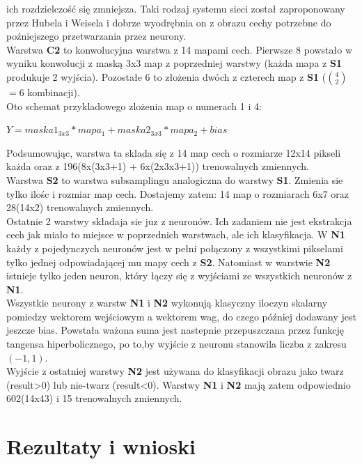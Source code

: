 \documentclass[11pt,a4paper]{article}
\begin{document}
ich rozdzielczość się zmniejsza. Taki rodzaj systemu sieci został zaproponowany przez Hubela i Weisela i dobrze 
wyodrębnia on z obrazu cechy potrzebne do poźniejszego przetwarzania przez neurony.\\
\indent
Warstwa  \textbf{C2} to konwolucyjna warstwa z 14 mapami cech. Pierwsze 8 powstało w wyniku konwolucji 
z maską 3x3 map z poprzedniej warstwy (każda mapa z  \textbf{S1} produkuje 2 wyjścia).
Pozostałe 6 to złożenia dwóch z czterech map z  \textbf{S1} ($4\choose 2$ $=6$ kombinacji).\\
Oto schemat przykladowego zlożenia map o numerach 1 i 4:\\
\begin{center}
$Y = maska1_{3x3}*mapa_{1}+maska2_{3x3}*mapa_{2}+bias$
\end{center}
Podsumowując, warstwa ta sklada się z 14 map cech o rozmiarze 12x14 pikseli każda oraz z 196(8x(3x3+1)
+ 6x(2x3x3+1)) trenowalnych zmiennych.\\
\indent
Warstwa  \textbf{S2} to warstwa subsamplingu analogiczna do warstwy  \textbf{S1}. 
Zmienia sie tylko ilośc i rozmiar map cech. 
Dostajemy zatem: 14 map o rozmiarach 6x7 oraz 28(14x2) trenowalnych zmiennych.\\
\indent
Ostatnie 2 warstwy składaja sie juz z neuronów. Ich zadaniem nie jest ekstrakcja cech jak miało to miejsce 
w poprzednich warstwach, ale ich klasyfikacja. W  \textbf{N1} każdy z pojedynczych neuronów jest w pełni
połączony z wszystkimi pikselami tylko jednej odpowiadającej mu mapy cech z  \textbf{S2}.
Natomiast w warstwie  \textbf{N2} istnieje tylko jeden neuron, który łączy się z wyjściami ze wszystkich neuronów 
z  \textbf{N1}. \\
\indent
Wszystkie neurony z warstw  \textbf{N1} i  \textbf{N2} wykonują klasyczny iloczyn skalarny pomiedzy wektorem 
wejściowym a wektorem wag, do czego później dodawany jest jeszcze bias. Powstała ważona suma jest nastepnie 
przepuszczana przez funkcję tangensa hiperbolicznego, po to,by wyjście z neuronu stanowila liczba z zakresu $(-1,1).$\\
Wyjście z ostatniej warstwy  \textbf{N2} jest używana do klasyfikacji obrazu jako twarz (result>0) lub nie-twarz (result<0).
Warstwy  \textbf{N1} i  \textbf{N2} mają zatem odpowiednio 602(14x43) i 15 trenowalnych zmiennych.\\
\section{Rezultaty i wnioski}
\end{document}
